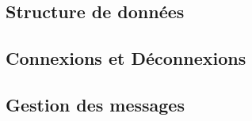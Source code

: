 
\subsection{Structure de données}
\subsection{Connexions et Déconnexions}
\subsection{Gestion des messages}


